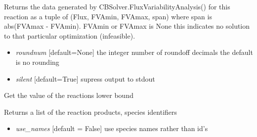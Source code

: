 \documentclass[a4paper,11pt,english]{sphinxmanual}
\begin{document}
\begin{fulllineitems}
\begin{fulllineitems}
\begin{itemize}
\end{itemize}

\end{fulllineitems}


\begin{fulllineitems}
\label{modules_doc:cbmpy.CBModel.Reaction.getFVAdata}
Returns the data generated by CBSolver.FluxVariabilityAnalysis() for this reaction as a tuple of
(Flux, FVAmin, FVAmax, span) where span is abs(FVAmax - FVAmin). FVAmin or FVAmax is None this indicates no solution
to that particular optimization (infeasible).
\begin{itemize}
\item {} 
\emph{roundnum} {[}default=None{]} the integer number of roundoff decimals the default is no rounding

\item {} 
\emph{silent} {[}default=True{]} supress output to stdout

\end{itemize}

\end{fulllineitems}


\begin{fulllineitems}
\label{modules_doc:cbmpy.CBModel.Reaction.getLowerBound}
Get the value of the reactions lower bound

\end{fulllineitems}


\begin{fulllineitems}
\label{modules_doc:cbmpy.CBModel.Reaction.getProductIds}
Returns a list of the reaction products, species identifiers
\begin{itemize}
\item {} 
\emph{use\_names} {[}default = False{]} use species names rather than id's

\end{itemize}

\end{fulllineitems}


\end{fulllineitems}
\end{document}

